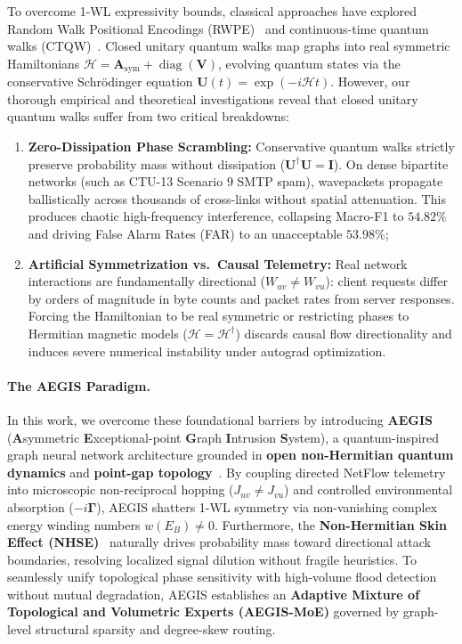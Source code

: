 \documentclass[10pt,twocolumn,letterpaper]{article}
\begin{document}
To overcome 1-WL expressivity bounds, classical approaches have explored Random Walk Positional Encodings (RWPE)~\cite{dwivedi2023benchmarking} and continuous-time quantum walks (CTQW)~\cite{childs2003exponential, rossi2017continuous}. Closed unitary quantum walks map graphs into real symmetric Hamiltonians $\mathcal{H} = \mathbf{A}_{\text{sym}} + \operatorname{diag}(\mathbf{V})$, evolving quantum states via the conservative Schr\"odinger equation $\mathbf{U}(t) = \exp(-i \mathcal{H} t)$. However, our thorough empirical and theoretical investigations reveal that closed unitary quantum walks suffer from two critical breakdowns:
\begin{enumerate}
    \item \textbf{Zero-Dissipation Phase Scrambling:} Conservative quantum walks strictly preserve probability mass without dissipation ($\mathbf{U}^\dagger \mathbf{U} = \mathbf{I}$). On dense bipartite networks (such as CTU-13 Scenario 9 SMTP spam), wavepackets propagate ballistically across thousands of cross-links without spatial attenuation. This produces chaotic high-frequency interference, collapsing Macro-F1 to $54.82\%$ and driving False Alarm Rates (FAR) to an unacceptable $53.98\%$;
    \item \textbf{Artificial Symmetrization vs.\ Causal Telemetry:} Real network interactions are fundamentally directional ($W_{uv} \ne W_{vu}$): client requests differ by orders of magnitude in byte counts and packet rates from server responses. Forcing the Hamiltonian to be real symmetric or restricting phases to Hermitian magnetic models ($\mathcal{H} = \mathcal{H}^\dagger$) discards causal flow directionality and induces severe numerical instability under autograd optimization.
\end{enumerate}

\paragraph{The AEGIS Paradigm.}
In this work, we overcome these foundational barriers by introducing \textbf{AEGIS} (\textbf{A}symmetric \textbf{E}xceptional-point \textbf{G}raph \textbf{I}ntrusion \textbf{S}ystem), a quantum-inspired graph neural network architecture grounded in \textbf{open non-Hermitian quantum dynamics} and \textbf{point-gap topology}~\cite{hatano1996localization, gong2018topological, kawabata2019symmetry, ashida2020nonhermitian}. By coupling directed NetFlow telemetry into microscopic non-reciprocal hopping ($J_{uv} \ne J_{vu}$) and controlled environmental absorption ($-i\boldsymbol{\Gamma}$), AEGIS shatters 1-WL symmetry via non-vanishing complex energy winding numbers $w(E_B) \ne 0$. Furthermore, the \textbf{Non-Hermitian Skin Effect (NHSE)}~\cite{yao2018edge, bergholtz2021exceptional} naturally drives probability mass toward directional attack boundaries, resolving localized signal dilution without fragile heuristics. To seamlessly unify topological phase sensitivity with high-volume flood detection without mutual degradation, AEGIS establishes an \textbf{Adaptive Mixture of Topological and Volumetric Experts (AEGIS-MoE)} governed by graph-level structural sparsity and degree-skew routing.
\end{document}
